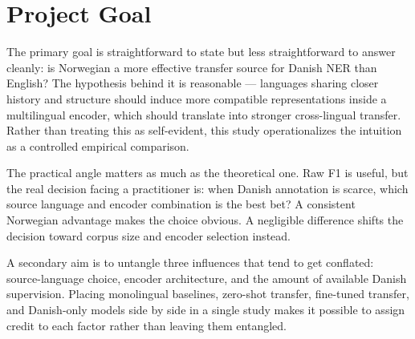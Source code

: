 \section{Project Goal}
The primary goal is straightforward to state but less straightforward to answer cleanly: is Norwegian a more effective transfer source for Danish NER than English? The hypothesis behind it is reasonable — languages sharing closer history and structure should induce more compatible representations inside a multilingual encoder, which should translate into stronger cross-lingual transfer. Rather than treating this as self-evident, this study operationalizes the intuition as a controlled empirical comparison.

The practical angle matters as much as the theoretical one. Raw F1 is useful, but the real decision facing a practitioner is: when Danish annotation is scarce, which source language and encoder combination is the best bet? A consistent Norwegian advantage makes the choice obvious. A negligible difference shifts the decision toward corpus size and encoder selection instead.

A secondary aim is to untangle three influences that tend to get conflated: source-language choice, encoder architecture, and the amount of available Danish supervision. Placing monolingual baselines, zero-shot transfer, fine-tuned transfer, and Danish-only models side by side in a single study makes it possible to assign credit to each factor rather than leaving them entangled.
